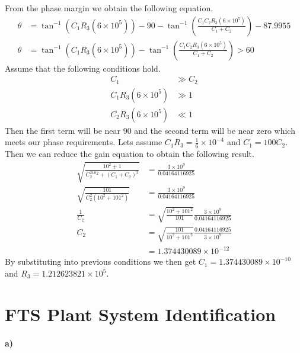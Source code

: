 \documentclass[12pt]{article}
\begin{document}
From the phase margin we obtain the following equation.
\begin{align*}
    \theta &= \tan^{-1}(C_1R_3(6\times 10^5))-90-\tan^{-1}\left(\frac{C_1C_2R_3(6\times 10^5)}{C_1+C_2}\right)-87.9955\\
    \theta &= \tan^{-1}(C_1R_3(6\times 10^5))-\tan^{-1}\left(\frac{C_1C_2R_3(6\times 10^5)}{C_1+C_2}\right) > 60
\end{align*}
Assume that the following conditions hold.
\begin{align*}
    C_1 &\gg C_2\\
    C_1R_3(6\times 10^5) &\gg 1\\
    C_2R_3(6\times 10^5) &\ll 1
\end{align*}
Then the first term will be near 90 and the second term will be near zero which meets our phase requirements.
Lets assume \(C_1R_3 = \frac{1}{6} \times 10^{-4}\) and \(C_1 = 100C_2\). Then we can reduce the gain
equation to obtain the following result.
\begin{align*}
    \sqrt{\frac{10^2 + 1}{C_2^210^2 + (C_1 + C_2)^2}}&=\frac{3\times10^9}{0.04164116925}\\
    \sqrt{\frac{101}{C_2^2(10^2+101^2)}}&=\frac{3\times10^9}{0.04164116925}\\
    \frac{1}{C_2}&=\sqrt{\frac{10^2+101^2}{101}}\frac{3\times10^9}{0.04164116925}\\
    C_2&=\sqrt{\frac{101}{10^2+101^2}}\frac{0.04164116925}{3\times10^9}\\
    &=1.374430089\times 10^{-12}
\end{align*}
By substituting into previous conditions we then get \(C_1=1.374430089\times 10^{-10}\) and \(R_3=1.212623821\times10^5\).

\section{FTS Plant System Identification}

\paragraph{a)}
\end{document}
